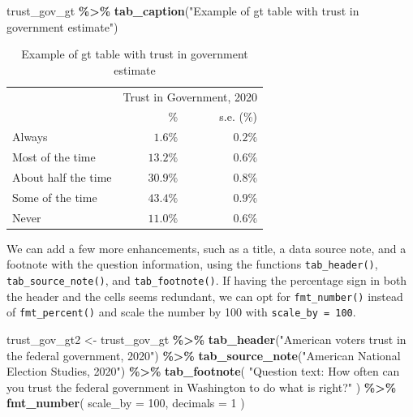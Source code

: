 \documentclass[
]{krantz}
\makeatletter
\newenvironment{Shaded}{\begin{snugshade}}{\end{snugshade}}
\newcommand{\AttributeTok}[1]{\textcolor[rgb]{0.27,0.27,0.27}{#1}}
\newcommand{\DecValTok}[1]{\textcolor[rgb]{0.06,0.06,0.06}{#1}}
\newcommand{\FunctionTok}[1]{\textcolor[rgb]{0.27,0.27,0.27}{\textbf{#1}}}
\newcommand{\NormalTok}[1]{#1}
\newcommand{\OtherTok}[1]{\textcolor[rgb]{0.37,0.37,0.37}{#1}}
\newcommand{\SpecialCharTok}[1]{\textcolor[rgb]{0.43,0.43,0.43}{\textbf{#1}}}
\newcommand{\StringTok}[1]{\textcolor[rgb]{0.5,0.5,0.5}{#1}}
\newenvironment{kframe}{%
\medskip{}
\setlength{\fboxsep}{.8em}
 \def\at@end@of@kframe{}%
 \ifinner\ifhmode%
  \def\at@end@of@kframe{\end{minipage}}%
  \begin{minipage}{\columnwidth}%
 \fi\fi%
 \def\FrameCommand##1{\hskip\@totalleftmargin \hskip-\fboxsep
 \colorbox{shadecolor}{##1}\hskip-\fboxsep
     \hskip-\linewidth \hskip-\@totalleftmargin \hskip\columnwidth}%
 \MakeFramed {\advance\hsize-\width
   \@totalleftmargin\z@ \linewidth\hsize
   \@setminipage}}%
 {\par\unskip\endMakeFramed%
 \at@end@of@kframe}
\renewenvironment{Shaded}{\begin{kframe}}{\end{kframe}}
\makeatother
\begin{document}
\begin{Shaded}
\begin{Highlighting}[]
\NormalTok{trust\_gov\_gt }\SpecialCharTok{\%\textgreater{}\%}
  \FunctionTok{tab\_caption}\NormalTok{(}\StringTok{"Example of gt table with trust in government estimate"}\NormalTok{)}
\end{Highlighting}
\end{Shaded}



\begin{longtable}{l|rr}
\caption{\label{tab:results-table-gt1-tab}Example of gt table with trust in government estimate}\\
\toprule
\multicolumn{1}{l}{} & \multicolumn{2}{c}{Trust in Government, 2020} \\ 
\cmidrule(lr){2-3}
\multicolumn{1}{l}{} & \% & s.e. (\%) \\ 
\midrule
Always & $1.6\%$ & $0.2\%$ \\ 
Most of the time & $13.2\%$ & $0.6\%$ \\ 
About half the time & $30.9\%$ & $0.8\%$ \\ 
Some of the time & $43.4\%$ & $0.9\%$ \\ 
Never & $11.0\%$ & $0.6\%$ \\ 
\bottomrule
\end{longtable}

We can add a few more enhancements, such as a title, a data source note, and a footnote with the question information, using the functions \texttt{tab\_header()}, \texttt{tab\_source\_note()}, and \texttt{tab\_footnote()}. If having the percentage sign in both the header and the cells seems redundant, we can opt for \texttt{fmt\_number()} instead of \texttt{fmt\_percent()} and scale the number by 100 with \texttt{scale\_by\ =\ 100}.

\begin{Shaded}
\begin{Highlighting}[]
\NormalTok{trust\_gov\_gt2 }\OtherTok{\textless{}{-}}\NormalTok{ trust\_gov\_gt }\SpecialCharTok{\%\textgreater{}\%}
  \FunctionTok{tab\_header}\NormalTok{(}\StringTok{"American voter\textquotesingle{}s trust}
\StringTok{             in the federal government, 2020"}\NormalTok{) }\SpecialCharTok{\%\textgreater{}\%}
  \FunctionTok{tab\_source\_note}\NormalTok{(}\StringTok{"American National Election Studies, 2020"}\NormalTok{) }\SpecialCharTok{\%\textgreater{}\%}
  \FunctionTok{tab\_footnote}\NormalTok{(}
    \StringTok{"Question text: How often can you trust the federal government}
\StringTok{    in Washington to do what is right?"}
\NormalTok{  ) }\SpecialCharTok{\%\textgreater{}\%}
  \FunctionTok{fmt\_number}\NormalTok{(}
    \AttributeTok{scale\_by =} \DecValTok{100}\NormalTok{,}
    \AttributeTok{decimals =} \DecValTok{1}
\NormalTok{  )}
\end{Highlighting}
\end{Shaded}
\end{document}

